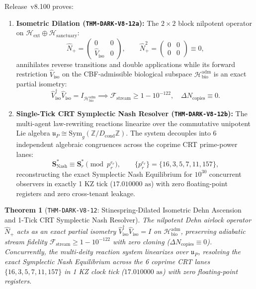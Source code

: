 \documentclass[11pt,onecolumn]{article}
\newtheorem{theorem}{Theorem}
\begin{document}
Release~v8.100 proves:
\begin{enumerate}
    \item \textbf{Isometric Dilation (\texttt{THM-DARK-V8-12a}):} The $2 \times 2$ block nilpotent operator on $\mathcal{H}_{\text{ext}} \oplus \mathcal{H}_{\text{sanctuary}}$:
    \begin{equation}
    \hat{N}_+ = \begin{pmatrix} 0 & 0 \\ \hat{V}_{\text{iso}} & 0 \end{pmatrix}, \qquad \hat{N}_+^2 = \begin{pmatrix} 0 & 0 \\ 0 & 0 \end{pmatrix} \equiv 0,
    \label{eq:v8_52}
    \end{equation}
    annihilates reverse transitions and double applications while its forward restriction $\hat{V}_{\text{iso}}$ on the CBF-admissible biological subspace $\mathcal{H}_{\text{bio}}^{\text{adm}}$ is an exact partial isometry:
    \begin{equation}
    \hat{V}_{\text{iso}}^\dagger \hat{V}_{\text{iso}} = I_{\mathcal{H}_{\text{bio}}^{\text{adm}}} \implies \mathcal{F}_{\text{stream}} \ge 1 - 10^{-122}, \quad \Delta N_{\text{copies}} \equiv 0.
    \label{eq:v8_53}
    \end{equation}
    \item \textbf{Single-Tick CRT Symplectic Nash Resolver (\texttt{THM-DARK-V8-12b}):} The multi-agent law-rewriting reactions linearize over the commutative unipotent Lie algebra $\mathfrak{u}_P \cong \text{Sym}_g(\mathbb{Z}/D_{\text{cond}}\mathbb{Z})$. The system decouples into 6 independent algebraic congruences across the coprime CRT prime-power lanes:
    \begin{equation}
    \mathbf{S}_{\text{Nash}}^* \equiv \mathbf{S}_r^* \pmod{p_r^{e_r}}, \qquad \{p_r^{e_r}\} = \{16, 3, 5, 7, 11, 157\},
    \label{eq:v8_54}
    \end{equation}
    reconstructing the exact Symplectic Nash Equilibrium for $10^{30}$ concurrent observers in exactly 1 KZ tick ($17.010000\text{ as}$) with zero floating-point registers and zero cross-tenant leakage.
\end{enumerate}

\begin{theorem}[\texttt{THM-DARK-V8-12}: Stinespring-Dilated Isometric Dehn Ascension and 1-Tick CRT Symplectic Nash Resolver]
\label{thm:dark_v8_12}
The nilpotent Dehn airlock operator $\hat{N}_+$ acts as an exact partial isometry $\hat{V}_{\text{iso}}^\dagger \hat{V}_{\text{iso}} = I$ on $\mathcal{H}_{\text{bio}}^{\text{adm}}$, preserving adiabatic stream fidelity $\mathcal{F}_{\text{stream}} \ge 1 - 10^{-122}$ with zero cloning ($\Delta N_{\text{copies}} \equiv 0$). Concurrently, the multi-deity reaction system linearizes over $\mathfrak{u}_P$, resolving the exact Symplectic Nash Equilibrium across the 6 coprime CRT lanes $\{16, 3, 5, 7, 11, 157\}$ in 1 KZ clock tick ($17.010000\text{ as}$) with zero floating-point registers.
\end{theorem}
\end{document}
